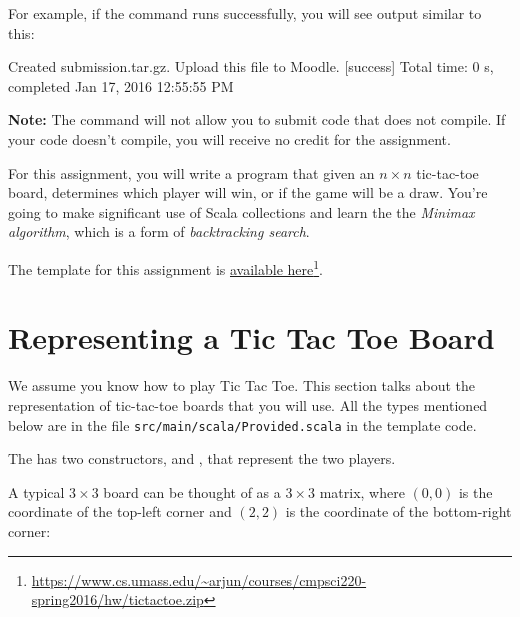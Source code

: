 \documentclass{book}
\begin{document}
For example, if the command runs successfully, you will see output similar
to this:
%
\begin{console}
Created submission.tar.gz. Upload this file to Moodle.
[success] Total time: 0 s, completed Jan 17, 2016 12:55:55 PM
\end{console}

\textbf{Note:}  The command will not allow you to submit code that does not
compile. If your code doesn't compile, you will receive no credit for the
assignment.


For this assignment, you will write a program that given an $n \times n$ tic-tac-toe board,
determines which player will win, or if the game will be a draw.
You're going to make significant use of Scala collections and learn the the
\emph{Minimax algorithm}, which is a form of \emph{backtracking search}.

The template for this assignment is
\href{https://www.cs.umass.edu/~arjun/courses/cmpsci220-spring2016/hw/tictactoe.zip}{available here}\footnote{\url{https://www.cs.umass.edu/~arjun/courses/cmpsci220-spring2016/hw/tictactoe.zip}}.


\section{Representing a Tic Tac Toe Board}

We assume you know how to play Tic Tac Toe. This section talks about
the representation of tic-tac-toe boards that you will use. All
the types mentioned below are in the file \texttt{src/main/scala/Provided.scala}
in the template code.

The  has two constructors,
 and , that represent the
two players.

A typical $3 \times 3$ board can be thought of as a $3 \times 3$ matrix,
where $(0, 0)$ is
the coordinate of the top-left corner and $(2,2)$ is the coordinate of
the bottom-right corner:

\end{document}
